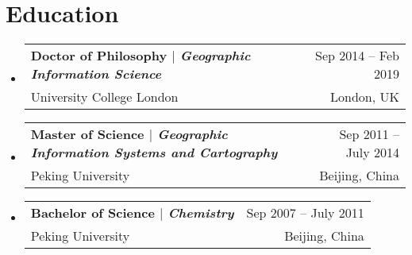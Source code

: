 \documentclass[A4,11pt]{article}
\makeatletter
\newcommand{\CVSubheading}[4]{
  \vspace{-2pt}\item
    \begin{tabular*}{0.97\textwidth}[t]{l@{\extracolsep{\fill}}r}
      \textbf{#1} & #2 \\
      \small#3 & \small #4 \\
    \end{tabular*}\vspace{-7pt}
}
\newcommand{\CVSubHeadingListStart}{\begin{itemize}[leftmargin=0.5cm, label={}]}
\newcommand{\CVSubHeadingListEnd}{\end{itemize}}
\makeatother
\begin{document}
\begin{comment}
This CV was written for specifically for positions I was applying for in
academia, and then modified to be a template.

A standard CV is about two pages long where as a resume in the US is one page.
sections can be added and removed here with this in mind. In my experience, 
education, and applicable work experience and skills are the most import things
to include on a resume. For a CV the Europass CV suggests the categories: Work
Experience, Education and Training, Language Skills, Digital Skills,
Communication and Interpersonal Skills, Conferences and Seminars, Creative Works
Driver's License, Hobbies and Interests, Honors and Awards, Management and
Leadership Skills, Networks and Memberships, Organizational Skills, Projects,
Publications, Recommendations, Social and Political Activities, Volunteering.

Your goal is to convey a who, what , when, where, why for every item you share. 
The who is obviously you, but I believe the rest should be done in that order.
For example below. An employer cares most about the degree held and typically 
less about the institution or where it is located (This is still good 
information though). Whatever order you choose be consistent throughout.
\end{comment}

\section{Education}
  \CVSubHeadingListStart
    \CVSubheading
      {{Doctor of Philosophy $|$ \emph{\small{Geographic Information Science}}}}{Sep 2014 -- Feb 2019}
      {University College London}{London, UK}
    \CVSubheading
      {{Master of Science $|$ \emph{\small{Geographic Information Systems and Cartography}}}}{Sep 2011 -- July 2014}
      {Peking University}{Beijing, China}
    \CVSubheading
      {{Bachelor of Science $|$ \emph{\small{Chemistry}}}}{Sep 2007 -- July 2011}
      {Peking University}{Beijing, China} 
  \CVSubHeadingListEnd

\begin{comment}
try to briefly explain what you did and why it is relevant to the position you
are seeking
\end{comment}
\end{document}
